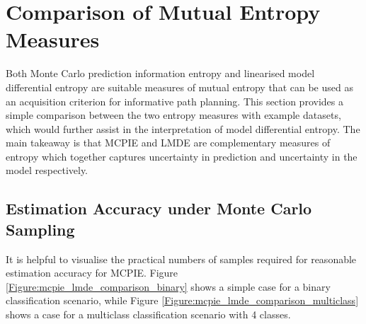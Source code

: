 				
			
	\section{Comparison of Mutual Entropy Measures}
	\label{InformativeSeafloorExploration:ComparisonMutualEntropyMeasures}
	
		Both Monte Carlo prediction information entropy and linearised model differential entropy are suitable measures of mutual entropy that can be used as an acquisition criterion for informative path planning. This section provides a simple comparison between the two entropy measures with example datasets, which would further assist in the interpretation of model differential entropy. The main takeaway is that MCPIE and LMDE are complementary measures of entropy which together captures uncertainty in prediction and uncertainty in the model respectively.
	
		\subsection{Estimation Accuracy under Monte Carlo Sampling}
		\label{InformativeSeafloorExploration:ComparisonMutualEntropyMeasures:EstimationAccuracy}
		
			It is helpful to visualise the practical numbers of samples required for reasonable estimation accuracy for MCPIE. Figure \ref{Figure:mcpie_lmde_comparison_binary} shows a simple case for a binary classification scenario, while Figure \ref{Figure:mcpie_lmde_comparison_multiclass} shows a case for a multiclass classification scenario with 4 classes. 
			
